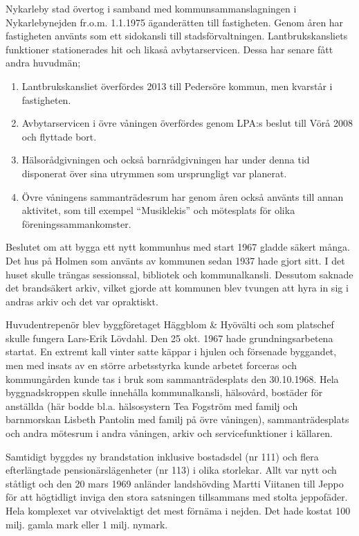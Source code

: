 Nykarleby stad övertog i samband med kommunsammanslagningen i Nykarlebynejden fr.o.m. 1.1.1975 äganderätten till fastigheten. Genom åren har fastigheten använts som ett sidokansli till stadsförvaltningen. Lantbrukskansliets funktioner stationerades hit och likaså avbytarservicen. Dessa har senare fått andra huvudmän;
\begin{enumerate}
  \item Lantbrukskansliet överfördes 2013 till Pedersöre kommun, men kvarstår i fastigheten.
  \item Avbytarservicen i övre  våningen överfördes genom LPA:s beslut till Vörå 2008 och flyttade bort.
  \item Hälsorådgivningen och också barnrådgivningen har under denna tid disponerat över sina utrymmen som ursprungligt var planerat.
  \item Övre våningens sammanträdesrum har genom åren också använts till annan aktivitet, som till exempel ``Musiklekis'' och mötesplats för olika föreningssammankomster.
\end{enumerate}


Beslutet om att bygga ett nytt kommunhus med start 1967 gladde säkert många. Det hus på Holmen som använts av kommunen sedan 1937 hade gjort sitt. I det huset skulle trängas sessionssal, bibliotek och kommunalkansli. Dessutom saknade det brandsäkert arkiv, vilket gjorde att kommunen blev tvungen att hyra in sig i andras arkiv och det var opraktiskt.

Huvudentrepenör blev byggföretaget Häggblom \& Hyövälti och som platschef skulle fungera Lars-Erik Lövdahl. Den 25 okt. 1967 hade grundningsarbetena startat. En extremt kall vinter satte käppar i hjulen och försenade byggandet, men med insats av en större arbetsstyrka kunde arbetet forceras och kommungården kunde tas i bruk som sammanträdesplats den 30.10.1968. Hela byggnadskroppen skulle innehålla kommunalkansli, hälsovård, bostäder för anställda (här bodde bl.a. hälsosystern Tea Fogström med familj och barnmorskan Lisbeth Pantolin med familj på övre våningen), sammanträdesplats och andra mötesrum i andra våningen, arkiv och servicefunktioner i källaren.

Samtidigt byggdes ny brandstation inklusive bostadsdel (nr 111) och flera efterlängtade pensionärslägenheter (nr 113) i olika storlekar. Allt var nytt och ståtligt och den 20 mars 1969 anländer landshövding Martti Viitanen till Jeppo för att högtidligt inviga den stora satsningen tillsammans med stolta jeppofäder. Hela komplexet var otvivelaktigt det mest förnäma i nejden. Det hade kostat 100 milj. gamla mark eller 1 milj. nymark.



